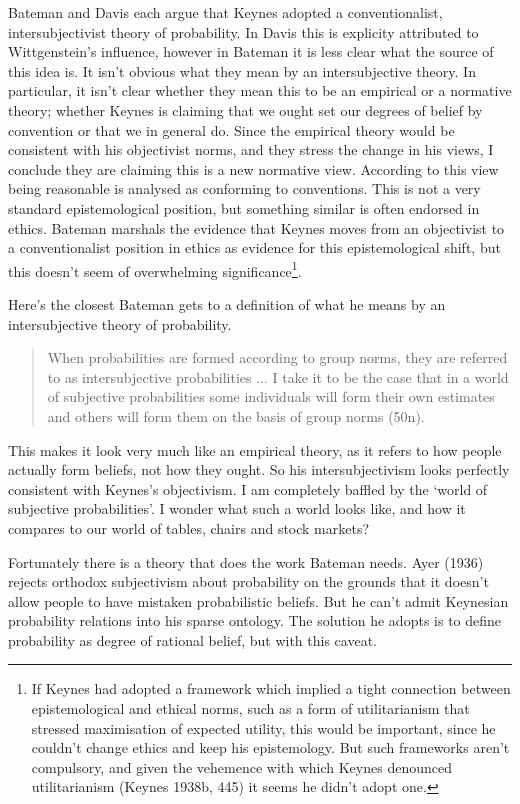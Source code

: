 \documentclass[noflushend]{philosophersimprint}
\begin{document}
Bateman and Davis each argue that Keynes adopted a conventionalist,
intersubjectivist theory of probability. In Davis this is explicity
attributed to Wittgenstein's influence, however in Bateman it is less
clear what the source of this idea is. It isn't obvious what they mean
by an intersubjective theory. In particular, it isn't clear whether they
mean this to be an empirical or a normative theory; whether Keynes is
claiming that we ought set our degrees of belief by convention or that
we in general do. Since the empirical theory would be consistent with
his objectivist norms, and they stress the change in his views, I
conclude they are claiming this is a new normative view. According to
this view being reasonable is analysed as conforming to conventions.
This is not a very standard epistemological position, but something
similar is often endorsed in ethics. Bateman marshals the evidence that
Keynes moves from an objectivist to a conventionalist position in ethics
as evidence for this epistemological shift, but this doesn't seem of
overwhelming significance\footnote{If Keynes had adopted a framework
  which implied a tight connection between epistemological and ethical
  norms, such as a form of utilitarianism that stressed maximisation of
  expected utility, this would be important, since he couldn't change
  ethics and keep his epistemology. But such frameworks aren't
  compulsory, and given the vehemence with which Keynes denounced
  utilitarianism (Keynes 1938b, 445) it seems he didn't adopt one.}.

Here's the closest Bateman gets to a definition of what he means by an
intersubjective theory of probability.

\begin{quote}
When probabilities are formed according to group norms, they are
referred to as intersubjective probabilities ... I take it to be the
case that in a world of subjective probabilities some individuals will
form their own estimates and others will form them on the basis of group
norms (50n).
\end{quote}

This makes it look very much like an empirical theory, as it refers to
how people actually form beliefs, not how they ought. So his
intersubjectivism looks perfectly consistent with Keynes's objectivism.
I am completely baffled by the `world of subjective probabilities'. I
wonder what such a world looks like, and how it compares to our world of
tables, chairs and stock markets?

Fortunately there is a theory that does the work Bateman needs. Ayer
(1936) rejects orthodox subjectivism about probability on the grounds
that it doesn't allow people to have mistaken probabilistic beliefs. But
he can't admit Keynesian probability relations into his sparse ontology.
The solution he adopts is to define probability as degree of rational
belief, but with this caveat.
\end{document}
